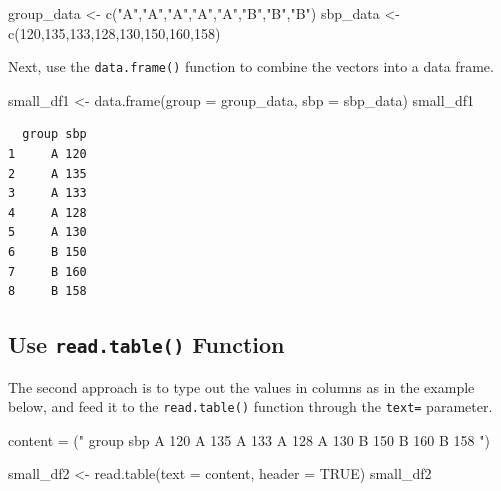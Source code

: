 \documentclass[
  letterpaper,
  DIV=11,
  numbers=noendperiod]{scrreprt}
\newenvironment{Shaded}{\begin{snugshade}}{\end{snugshade}}
\newcommand{\AttributeTok}[1]{\textcolor[rgb]{0.40,0.45,0.13}{#1}}
\newcommand{\ConstantTok}[1]{\textcolor[rgb]{0.56,0.35,0.01}{#1}}
\newcommand{\DecValTok}[1]{\textcolor[rgb]{0.68,0.00,0.00}{#1}}
\newcommand{\FunctionTok}[1]{\textcolor[rgb]{0.28,0.35,0.67}{#1}}
\newcommand{\NormalTok}[1]{\textcolor[rgb]{0.00,0.23,0.31}{#1}}
\newcommand{\OtherTok}[1]{\textcolor[rgb]{0.00,0.23,0.31}{#1}}
\newcommand{\StringTok}[1]{\textcolor[rgb]{0.13,0.47,0.30}{#1}}
\begin{document}
\begin{Shaded}
\begin{Highlighting}[]
\NormalTok{group\_data }\OtherTok{\textless{}{-}} \FunctionTok{c}\NormalTok{(}\StringTok{"A"}\NormalTok{,}\StringTok{"A"}\NormalTok{,}\StringTok{"A"}\NormalTok{,}\StringTok{"A"}\NormalTok{,}\StringTok{"A"}\NormalTok{,}\StringTok{"B"}\NormalTok{,}\StringTok{"B"}\NormalTok{,}\StringTok{"B"}\NormalTok{)}
\NormalTok{sbp\_data }\OtherTok{\textless{}{-}} \FunctionTok{c}\NormalTok{(}\DecValTok{120}\NormalTok{,}\DecValTok{135}\NormalTok{,}\DecValTok{133}\NormalTok{,}\DecValTok{128}\NormalTok{,}\DecValTok{130}\NormalTok{,}\DecValTok{150}\NormalTok{,}\DecValTok{160}\NormalTok{,}\DecValTok{158}\NormalTok{)}
\end{Highlighting}
\end{Shaded}

Next, use the \texttt{data.frame()} function to combine the vectors into
a data frame.

\begin{Shaded}
\begin{Highlighting}[]
\NormalTok{small\_df1 }\OtherTok{\textless{}{-}} \FunctionTok{data.frame}\NormalTok{(}\AttributeTok{group =}\NormalTok{ group\_data,}
                       \AttributeTok{sbp =}\NormalTok{ sbp\_data)}
\NormalTok{small\_df1}
\end{Highlighting}
\end{Shaded}

\begin{verbatim}
  group sbp
1     A 120
2     A 135
3     A 133
4     A 128
5     A 130
6     B 150
7     B 160
8     B 158
\end{verbatim}

\subsection{\texorpdfstring{Use \texttt{read.table()}
Function}{Use read.table() Function}}\label{use-read.table-function}

The second approach is to type out the values in columns as in the
example below, and feed it to the \texttt{read.table()} function through
the \texttt{text=} parameter.

\begin{Shaded}
\begin{Highlighting}[]
\NormalTok{content }\OtherTok{=}\NormalTok{ (}\StringTok{"}
\StringTok{group sbp}
\StringTok{A 120}
\StringTok{A 135}
\StringTok{A 133}
\StringTok{A 128}
\StringTok{A 130}
\StringTok{B 150}
\StringTok{B 160}
\StringTok{B 158}
\StringTok{"}\NormalTok{)}

\NormalTok{small\_df2 }\OtherTok{\textless{}{-}} \FunctionTok{read.table}\NormalTok{(}\AttributeTok{text =}\NormalTok{ content, }\AttributeTok{header =} \ConstantTok{TRUE}\NormalTok{)}
\NormalTok{small\_df2}
\end{Highlighting}
\end{Shaded}
\end{document}
